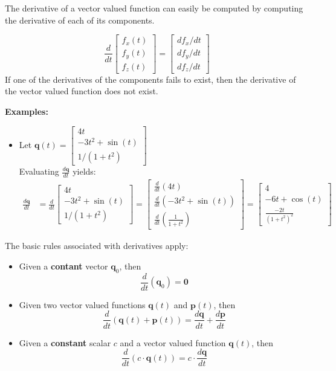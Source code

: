 \documentclass{article}
\begin{document}
The derivative of a vector valued function can easily be computed by computing the derivative of each of its components.

\[\frac{d}{dt}\begin{bmatrix} f_x(t) \\ f_y(t) \\ f_z(t) \end{bmatrix} = \begin{bmatrix} df_x/dt \\ df_y/dt \\ df_z/dt \end{bmatrix}\]
If one of the derivatives of the components fails to exist, then the derivative of the vector valued function does not exist.

\textbf{Examples:}
\begin{itemize}
\item Let \(\mathbf{q}(t) = \begin{bmatrix} 4t \\ -3t^2 + \sin(t) \\ 1/(1 + t^2) \end{bmatrix}\) \\
Evaluating \(\frac{d\mathbf{q}}{dt}\) yields:
\begin{align*}
\frac{d\mathbf{q}}{dt} & = \frac{d}{dt}\begin{bmatrix} 4t \\ -3t^2 + \sin(t) \\ 1/(1 + t^2) \end{bmatrix} 
= \begin{bmatrix} \frac{d}{dt}(4t) \\ \frac{d}{dt}(-3t^2 + \sin(t)) \\ \frac{d}{dt}\left(\frac{1}{1 + t^2}\right) \end{bmatrix} 
= \begin{bmatrix} 4 \\ -6t + \cos(t) \\ \frac{-2t}{(1 + t^2)^2} \end{bmatrix} 
\end{align*}
\end{itemize}

\vspace{5mm}

The basic rules associated with derivatives apply:
\begin{itemize}
\item Given a {\bf contant} vector \(\mathbf{q}_0\), then
\[\frac{d}{dt}(\mathbf{q}_0) = \mathbf{0}\] 
\item Given two vector valued functions \(\mathbf{q}(t)\) and \(\mathbf{p}(t)\), then 
\[\frac{d}{dt}(\mathbf{q}(t) + \mathbf{p}(t)) = \frac{d\mathbf{q}}{dt} + \frac{d\mathbf{p}}{dt}\]
\item Given a {\bf constant} scalar \(c\) and a vector valued function \(\mathbf{q}(t)\), then 
\[\frac{d}{dt}(c \cdot \mathbf{q}(t)) = c \cdot \frac{d\mathbf{q}}{dt}\]
\end{itemize}
\end{document}
